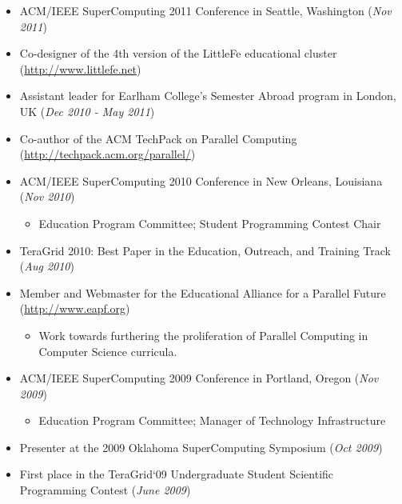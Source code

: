 \documentclass[10pt]{article}
\begin{document}
\begin{itemize}
  \addtolength{\itemsep}{-2mm}
	\item \indent ACM/IEEE SuperComputing 2011 Conference in Seattle, Washington (\emph{Nov 2011})
  \item \indent Co-designer of the 4th version of the LittleFe educational cluster (\url{http://www.littlefe.net})
	\item \indent Assistant leader for Earlham College's Semester Abroad program in London, UK (\emph{Dec 2010 - May 2011})
  \item \indent Co-author of the ACM TechPack on Parallel Computing (\url{http://techpack.acm.org/parallel/})
	\item \indent ACM/IEEE SuperComputing 2010 Conference in New Orleans, Louisiana (\emph{Nov 2010})
		\vspace{-2mm}
		\begin{itemize}
			\item \indent Education Program Committee; Student Programming Contest Chair
		\end{itemize}
		\vspace{-1mm}
	\item \indent TeraGrid 2010: Best Paper in the Education, Outreach, and Training Track (\emph{Aug 2010})
	\item \indent Member and Webmaster for the Educational Alliance for a Parallel Future (\url{http://www.eapf.org})
		\vspace{-2mm}
		\begin{itemize}
			\item \indent Work towards furthering the proliferation of Parallel Computing in Computer Science curricula.
		\end{itemize}
		\vspace{-1mm}
  \item \indent ACM/IEEE SuperComputing 2009 Conference in Portland, Oregon (\emph{Nov 2009})
		\vspace{-2mm}
		\begin{itemize}
			\item \indent Education Program Committee; Manager of Technology Infrastructure
		\end{itemize}
		\vspace{-1mm}
	\item \indent Presenter at the 2009 Oklahoma SuperComputing Symposium (\emph{Oct 2009})
	\item \indent First place in the TeraGrid`09 Undergraduate Student Scientific Programming Contest (\emph{June 2009})

\end{itemize}
\end{document}
